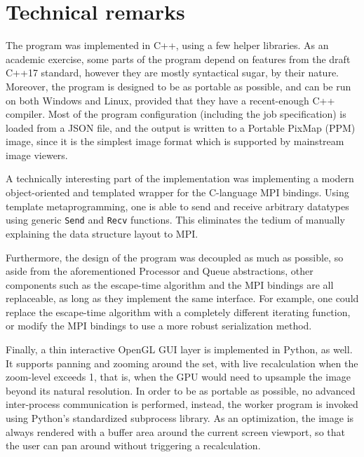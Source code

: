 \documentclass[a4paper]{article}
\begin{document}
	\section{Technical remarks}
	The program was implemented in C++, using a few helper libraries. As an academic exercise, some parts of the program depend on features from the draft C++17 standard, however they are mostly syntactical sugar, by their nature. Moreover, the program is designed to be as portable as possible, and can be run on both Windows and Linux, provided that they have a recent-enough C++ compiler. Most of the program configuration (including the job specification) is loaded from a JSON file, and the output is written to a Portable PixMap (PPM) image, since it is the simplest image format which is supported by mainstream image viewers.
	
	A technically interesting part of the implementation was implementing a modern object-oriented and templated wrapper for the C-language MPI bindings. Using template metaprogramming, one is able to send and receive arbitrary datatypes using generic \texttt{Send} and \texttt{Recv} functions. This eliminates the tedium of manually explaining the data structure layout to MPI.
	
	Furthermore, the design of the program was decoupled as much as possible, so aside from the aforementioned Processor and Queue abstractions, other components such as the escape-time algorithm and the MPI bindings are all replaceable, as long as they implement the same interface. For example, one could replace the escape-time algorithm with a completely different iterating function, or modify the MPI bindings to use a more robust serialization method.
	
	Finally, a thin interactive OpenGL GUI layer is implemented in Python, as well. It supports panning and zooming around the set, with live recalculation when the zoom-level exceeds 1, that is, when the GPU would need to upsample the image beyond its natural resolution. In order to be as portable as possible, no advanced inter-process communication is performed, instead, the worker program is invoked using Python's standardized subprocess library. As an optimization, the image is always rendered with a buffer area around the current screen viewport, so that the user can pan around without triggering a recalculation.
	
\end{document}
